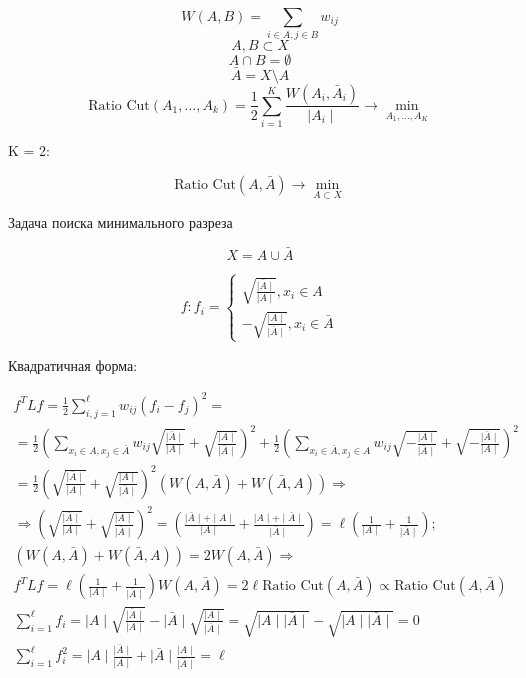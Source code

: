 \documentclass[a4paper, 12pt]{article}
\begin{document}
\[W(A, B) = \sum_{i \in A, j \in B}w_{ij}\]
\[A, B \subset X\]
\[A \cap B = \emptyset\]
\[\bar{A} = X \setminus A\]
\[\textrm{Ratio Cut}(A_1, \ldots, A_k) = 
\frac{1}{2} \sum_{i = 1}^K 
\frac{W(A_i, \bar{A}_i)}{\mid A_i \mid}
\rightarrow \min_{A_1, \ldots, A_K}\]

K = 2:

\[\textrm{Ratio Cut}(A, \bar{A}) 
\rightarrow \min_{A \subset X}\]

Задача поиска минимального разреза

\[X = A \cup \bar{A}\]

\[f: f_i =
\begin{cases}
    \sqrt{\frac{\mid\bar{A}\mid}{\mid A \mid}}, x_i \in A \\
    -\sqrt{\frac{\mid A\mid}{\mid \bar{A} \mid}}, x_i \in \bar{A}
\end{cases}\]

Квадратичная форма:

\begin{gather*}
    f^TLf = \frac{1}{2}\sum_{i, j = 1}^{\ell} 
    w_{ij}(f_i - f_j)^2 = \\
    = \frac{1}{2}\left(\sum_{x_i \in A, x_j \in \bar{A}} w_{ij}
    \sqrt{\frac{\mid\bar{A}\mid}{\mid A \mid}} +
    \sqrt{\frac{\mid A\mid}{\mid \bar{A} \mid}}\right)^2 +
    \frac{1}{2}\left(\sum_{x_i \in \bar{A}, x_j \in A} w_{ij}
    \sqrt{-\frac{\mid A \mid}{\mid \bar{A} \mid}} + 
    \sqrt{-\frac{\mid \bar{A} \mid}{\mid A \mid}}\right)^2 \\
    = \frac{1}{2}\left(\sqrt{\frac{\mid\bar{A}\mid}{\mid A \mid}} +
    \sqrt{\frac{\mid A\mid}{\mid \bar{A} \mid}}\right)^2
    (W(A, \bar{A}) + W(\bar{A}, A)) \Rightarrow \\
    \Rightarrow \left(\sqrt{\frac{\mid\bar{A}\mid}{\mid A \mid}} +
    \sqrt{\frac{\mid A\mid}{\mid \bar{A} \mid}}\right)^2
    = \left(\frac{\mid \bar{A} \mid + \mid A \mid}{\mid A \mid}
    + \frac{\mid A \mid + \mid \bar{A} \mid}{\mid \bar{A} \mid}\right)
    = \ell (\frac{1}{\mid A \mid} + \frac{1}{\mid \bar{A} \mid}); \\
    (W(A, \bar{A}) + W(\bar{A}, A)) = 2W(A, \bar{A}) \Rightarrow \\
    f^TLf = \ell(\frac{1}{\mid A \mid} + \frac{1}{\mid \bar{A} \mid})
    W(A, \bar{A}) = 2\ell\textrm{Ratio Cut}(A, \bar{A}) 
    \propto \textrm{Ratio Cut}(A, \bar{A}) \\
    \sum_{i = 1}^{\ell}f_i = \mid A \mid 
    \sqrt{\frac{\mid\bar{A}\mid}{\mid A \mid}} - 
    \mid \bar{A} \mid 
    \sqrt{\frac{\mid A \mid}{\mid \bar{A} \mid}}
    = \sqrt{\mid A \mid \mid \bar{A} \mid} - 
    \sqrt{\mid A \mid \mid \bar{A} \mid} = 0 \\
    \sum_{i = 1}^{\ell}f_i^2 = 
    \mid A \mid
    \frac{\mid\bar{A}\mid}{\mid A \mid} +
    \mid \bar{A} \mid 
    \frac{\mid A \mid}{\mid \bar{A} \mid}
    = \ell
\end{gather*}
\end{document}
